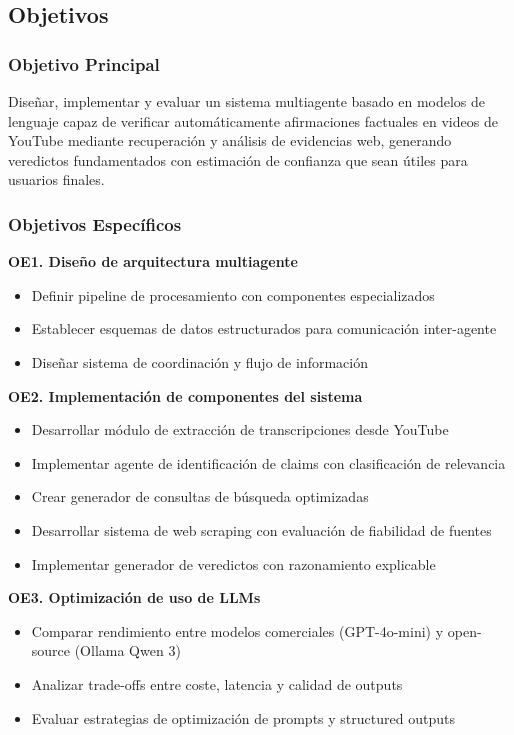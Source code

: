 \documentclass[12pt,a4paper,twoside]{book}
\begin{document}
\subsection{Objetivos}

\subsubsection{Objetivo Principal}

Diseñar, implementar y evaluar un sistema multiagente basado en modelos de lenguaje capaz de verificar automáticamente afirmaciones factuales en videos de YouTube mediante recuperación y análisis de evidencias web, generando veredictos fundamentados con estimación de confianza que sean útiles para usuarios finales.

\subsubsection{Objetivos Específicos}

\textbf{OE1. Diseño de arquitectura multiagente}
\begin{itemize}
    \item Definir pipeline de procesamiento con componentes especializados
    \item Establecer esquemas de datos estructurados para comunicación inter-agente
    \item Diseñar sistema de coordinación y flujo de información
\end{itemize}

\textbf{OE2. Implementación de componentes del sistema}
\begin{itemize}
    \item Desarrollar módulo de extracción de transcripciones desde YouTube
    \item Implementar agente de identificación de claims con clasificación de relevancia
    \item Crear generador de consultas de búsqueda optimizadas
    \item Desarrollar sistema de web scraping con evaluación de fiabilidad de fuentes
    \item Implementar generador de veredictos con razonamiento explicable
\end{itemize}

\textbf{OE3. Optimización de uso de LLMs}
\begin{itemize}
    \item Comparar rendimiento entre modelos comerciales (GPT-4o-mini) y open-source (Ollama Qwen 3)
    \item Analizar trade-offs entre coste, latencia y calidad de outputs
    \item Evaluar estrategias de optimización de prompts y structured outputs
\end{itemize}
\end{document}
